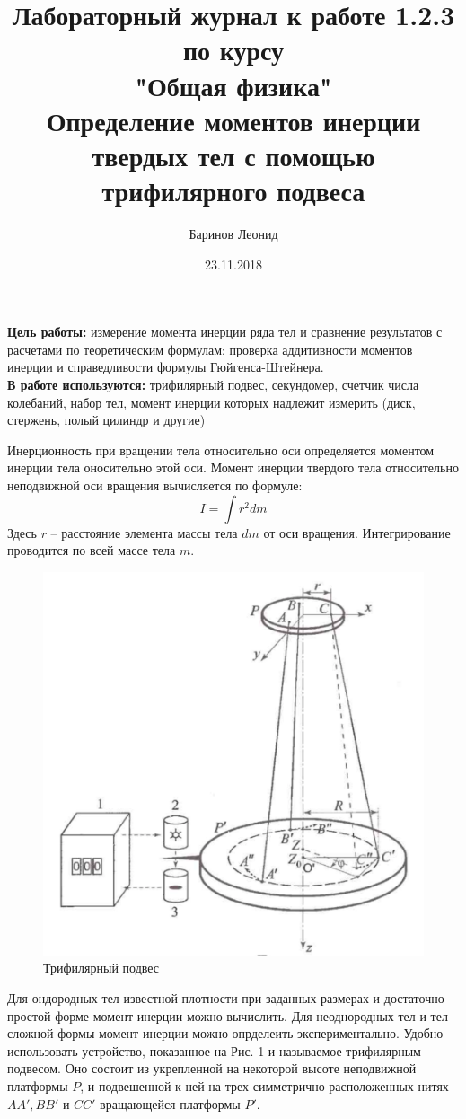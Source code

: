 \documentclass[a4paper,12pt]{article} %
\title{Лабораторный журнал к работе 1.2.3 по курсу \\ "Общая физика"  \\ 
\vspace{0.2cm}
\vspace{4.5cm}
 \LARGE{\textbf{Определение моментов инерции твердых тел с помощью трифилярного подвеса}}\vspace{5.5cm}}
\date{23.11.2018}
\author{\vspace{0.2cm}Баринов Леонид}
\begin{document}
\maketitle
\newpage
\textbf{Цель работы:} измерение момента инерции ряда тел и сравнение результатов с расчетами по теоретическим формулам; проверка аддитивности моментов инерции и справедливости формулы Гюйгенса-Штейнера.\\
\textbf{В работе используются:} трифилярный подвес, секундомер, счетчик числа колебаний, набор тел, момент инерции которых надлежит измерить (диск, стержень, полый цилиндр и другие)

Инерционность при вращении тела относительно оси определяется моментом инерции тела оносительно этой оси. Момент инерции твердого тела относительно неподвижной оси вращения вычисляется по формуле:
\begin{equation}
I = \int r^2dm
\end{equation}
Здесь $r$ -- расстояние элемента массы тела $dm$ от оси вращения. Интегрирование проводится по всей массе тела $m$.
\begin{figure}[h]
\centering
\includegraphics[scale=0.5]{1}
\caption{Трифилярный подвес}
\end{figure}

Для ондородных тел известной плотности при заданных размерах и достаточно простой форме момент инерции можно вычислить. Для неоднородных тел и тел сложной формы момент инерции можно опрделеить экспериментально. Удобно использовать устройство, показанное на Рис. 1 и называемое трифилярным подвесом. Оно состоит из укрепленной на некоторой высоте неподвижной платформы $P$, и подвешенной к ней на трех симметрично расположенных нитях $AA', BB'$ и $CC'$ вращающейся платформы $P'$.
\end{document}
